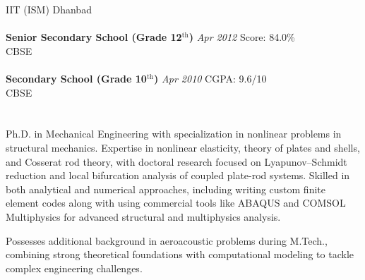 \documentclass[a4paper,10pt]{article}
\newcommand{\mysectionast}[1]{\section*{\colorbox{lightgray}{\makebox[\linewidth][s]{#1\hfill}}}}
\begin{document}
\begin{tabbing}
		\>\>IIT (ISM) Dhanbad \\
		\\[-0.3cm]
		\>\textbf{Senior Secondary School (Grade 12$^{\mathrm{th}}$)} \> \> \> \> \textit{Apr 2012} \> \hspace{0.8cm}Score: 84.0\%  \\
		\>\>CBSE \\
		\\[-0.3cm]
		\>\textbf{Secondary School (Grade 10$^{\mathrm{th}}$)} \> \> \> \> \textit{Apr 2010} \> \hspace{0.5cm}CGPA: 9.6/10 \\
		\>\>CBSE
	\end{tabbing}
	\mysectionast{Professional Summary}
	
	
	
	Ph.D. in Mechanical Engineering with specialization in nonlinear problems in structural mechanics. Expertise in nonlinear elasticity, theory of plates and shells, and Cosserat rod theory, with doctoral research focused on Lyapunov–Schmidt reduction and local bifurcation analysis of coupled plate-rod systems. Skilled in both analytical and numerical approaches, including writing custom finite element codes along with using commercial tools like ABAQUS and COMSOL Multiphysics for advanced structural and multiphysics analysis.
	
	Possesses additional background in aeroacoustic problems during M.Tech., combining strong theoretical foundations with computational modeling to tackle complex engineering challenges.
	
\end{document}
